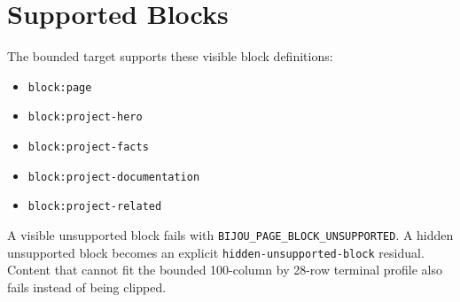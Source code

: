\section{Supported Blocks}\label{record-025-supported-blocks}

The bounded target supports these visible block definitions:

\begin{itemize}
\tightlist
\item
  \texttt{b\allowbreak{}l\allowbreak{}o\allowbreak{}c\allowbreak{}k\allowbreak{}:\allowbreak{}p\allowbreak{}a\allowbreak{}g\allowbreak{}e}
\item
  \texttt{b\allowbreak{}l\allowbreak{}o\allowbreak{}c\allowbreak{}k\allowbreak{}:\allowbreak{}p\allowbreak{}r\allowbreak{}o\allowbreak{}j\allowbreak{}e\allowbreak{}c\allowbreak{}t\allowbreak{}-\allowbreak{}h\allowbreak{}e\allowbreak{}r\allowbreak{}o}
\item
  \texttt{b\allowbreak{}l\allowbreak{}o\allowbreak{}c\allowbreak{}k\allowbreak{}:\allowbreak{}p\allowbreak{}r\allowbreak{}o\allowbreak{}j\allowbreak{}e\allowbreak{}c\allowbreak{}t\allowbreak{}-\allowbreak{}f\allowbreak{}a\allowbreak{}c\allowbreak{}t\allowbreak{}s}
\item
  \texttt{b\allowbreak{}l\allowbreak{}o\allowbreak{}c\allowbreak{}k\allowbreak{}:\allowbreak{}p\allowbreak{}r\allowbreak{}o\allowbreak{}j\allowbreak{}e\allowbreak{}c\allowbreak{}t\allowbreak{}-\allowbreak{}d\allowbreak{}o\allowbreak{}c\allowbreak{}u\allowbreak{}m\allowbreak{}e\allowbreak{}n\allowbreak{}t\allowbreak{}a\allowbreak{}t\allowbreak{}i\allowbreak{}o\allowbreak{}n}
\item
  \texttt{b\allowbreak{}l\allowbreak{}o\allowbreak{}c\allowbreak{}k\allowbreak{}:\allowbreak{}p\allowbreak{}r\allowbreak{}o\allowbreak{}j\allowbreak{}e\allowbreak{}c\allowbreak{}t\allowbreak{}-\allowbreak{}r\allowbreak{}e\allowbreak{}l\allowbreak{}a\allowbreak{}t\allowbreak{}e\allowbreak{}d}
\end{itemize}

A visible unsupported block fails with \texttt{B\allowbreak{}I\allowbreak{}J\allowbreak{}O\allowbreak{}U\allowbreak{}\_\allowbreak{}P\allowbreak{}A\allowbreak{}G\allowbreak{}E\allowbreak{}\_\allowbreak{}B\allowbreak{}L\allowbreak{}O\allowbreak{}C\allowbreak{}K\allowbreak{}\_\allowbreak{}U\allowbreak{}N\allowbreak{}S\allowbreak{}U\allowbreak{}P\allowbreak{}P\allowbreak{}O\allowbreak{}R\allowbreak{}T\allowbreak{}E\allowbreak{}D}. A hidden unsupported block becomes an explicit \texttt{h\allowbreak{}i\allowbreak{}d\allowbreak{}d\allowbreak{}e\allowbreak{}n\allowbreak{}-\allowbreak{}u\allowbreak{}n\allowbreak{}s\allowbreak{}u\allowbreak{}p\allowbreak{}p\allowbreak{}o\allowbreak{}r\allowbreak{}t\allowbreak{}e\allowbreak{}d\allowbreak{}-\allowbreak{}b\allowbreak{}l\allowbreak{}o\allowbreak{}c\allowbreak{}k} residual. Content that cannot fit the bounded 100-column by 28-row terminal profile also fails instead of being clipped.

